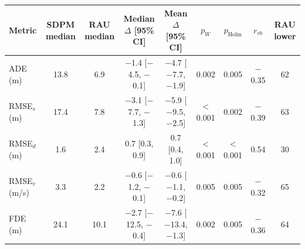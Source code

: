\begin{tabular}{lcccccccc}
\toprule
Metric & SDPM median & RAU median & Median $\Delta$ [95\% CI] & Mean $\Delta$ [95\% CI] & $p_W$ & $p_{\mathrm{Holm}}$ & $r_{rb}$ & RAU lower \\
\midrule
ADE (m) & 13.8 & 6.9 & \ensuremath{-}1.4 [\ensuremath{-}4.5, \ensuremath{-}0.1] & \ensuremath{-}4.7 [\ensuremath{-}7.7, \ensuremath{-}1.9] & 0.002 & 0.005 & \ensuremath{-}0.35 & 62 \\
RMSE$_s$ (m) & 17.4 & 7.8 & \ensuremath{-}3.1 [\ensuremath{-}7.7, \ensuremath{-}1.3] & \ensuremath{-}5.9 [\ensuremath{-}9.5, \ensuremath{-}2.5] & $<$0.001 & 0.002 & \ensuremath{-}0.39 & 63 \\
RMSE$_d$ (m) & 1.6 & 2.4 & 0.7 [0.3, 0.9] & 0.7 [0.4, 1.0] & $<$0.001 & $<$0.001 & 0.54 & 30 \\
RMSE$_v$ (m/s) & 3.3 & 2.2 & \ensuremath{-}0.6 [\ensuremath{-}1.2, \ensuremath{-}0.1] & \ensuremath{-}0.6 [\ensuremath{-}1.1, \ensuremath{-}0.2] & 0.005 & 0.005 & \ensuremath{-}0.32 & 65 \\
FDE (m) & 24.1 & 10.1 & \ensuremath{-}2.7 [\ensuremath{-}12.5, \ensuremath{-}0.4] & \ensuremath{-}7.6 [\ensuremath{-}13.4, \ensuremath{-}1.3] & 0.002 & 0.005 & \ensuremath{-}0.36 & 64 \\
\bottomrule
\end{tabular}
